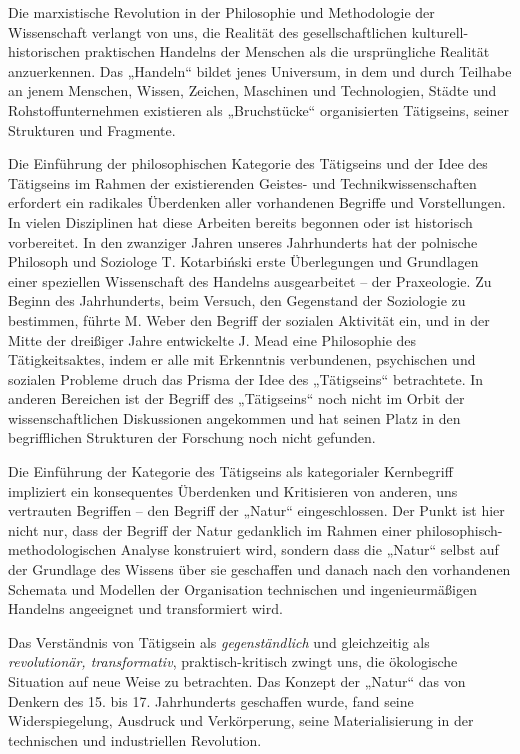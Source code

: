 \documentclass[11pt,a4paper]{article}
\begin{document}
Die marxistische Revolution in der Philosophie und Methodologie der
Wissenschaft verlangt von uns, die Realität des gesellschaftlichen
kulturell-historischen praktischen Handelns der Menschen als die ursprüngliche
Realität anzuerkennen.  Das „Handeln“ bildet jenes Universum, in dem und
durch Teilhabe an jenem Menschen, Wissen, Zeichen, Maschinen und Technologien,
Städte und Rohstoffunternehmen existieren als „Bruchstücke“ organisierten
Tätigseins, seiner Strukturen und Fragmente.

Die Einführung der philosophischen Kategorie des Tätigseins und der Idee des
Tätigseins im Rahmen der existierenden Geistes- und Technikwissenschaften
erfordert ein radikales Überdenken aller vorhandenen Begriffe und
Vorstellungen. In vielen Disziplinen hat diese Arbeiten bereits begonnen oder
ist historisch vorbereitet. In den zwanziger Jahren unseres Jahrhunderts hat
der polnische Philosoph und Soziologe T. Kotarbiński erste Überlegungen und
Grundlagen einer speziellen Wissenschaft des Handelns ausgearbeitet -- der
Praxeologie. Zu Beginn des Jahrhunderts, beim Versuch, den Gegenstand der
Soziologie zu bestimmen, führte M. Weber den Begriff der sozialen Aktivität
ein, und in der Mitte der dreißiger Jahre entwickelte J. Mead eine Philosophie
des Tätigkeitsaktes, indem er alle mit Erkenntnis verbundenen, psychischen und
sozialen Probleme druch das Prisma der Idee des „Tätigseins“ betrachtete. In
anderen Bereichen ist der Begriff des „Tätigseins“ noch nicht im Orbit der
wissenschaftlichen Diskussionen angekommen und hat seinen Platz in den
begriff\-lichen Strukturen der Forschung noch nicht gefunden.

Die Einführung der Kategorie des Tätigseins als kategorialer Kernbegriff
impliziert ein konsequentes Überdenken und Kritisieren von anderen, uns
vertrauten Begriffen -- den Begriff der „Natur“ eingeschlossen.  Der Punkt ist
hier nicht nur, dass der Begriff der Natur gedanklich im Rahmen einer
philosophisch-methodologischen Analyse konstruiert wird, sondern dass die
„Natur“ selbst auf der Grundlage des Wissens über sie geschaffen und danach
nach den vorhandenen Schemata und Modellen der Organisation technischen und
ingenieurmäßigen Handelns angeeignet und transformiert wird.

Das Verständnis von Tätigsein als \emph{gegenständlich} und gleichzeitig als
\emph{revolutionär, transformativ}, praktisch-kritisch zwingt uns, die
ökologische Situation auf neue Weise zu betrachten. Das Konzept der „Natur“
das von Denkern des 15. bis 17. Jahrhunderts geschaffen wurde, fand seine
Widerspiegelung, Ausdruck und Verkörperung, seine Materialisierung in der
technischen und industriellen Revolution.
\end{document}
